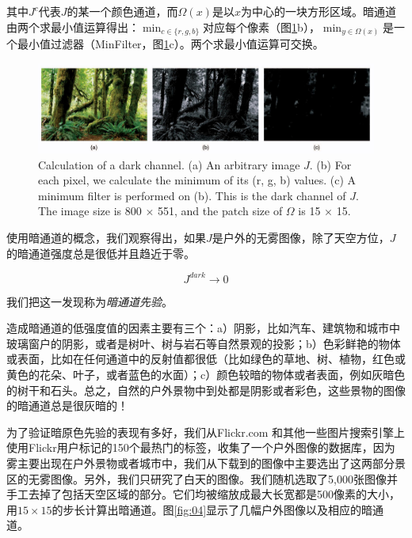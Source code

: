 \documentclass{ctexart}
\begin{document}
其中$J^c$代表$J$的某一个颜色通道，而$\Omega(x)$是以$x$为中心的一块方形区域。暗通道由两个求最小值运算得出：$\min_{c \in \{ r, g, b\}}$对应每个像素（图\ref{fig:03}b），$\min_{y \in \Omega(x)}$是一个最小值过滤器（MinFilter，图\ref{fig:03}c）。两个求最小值运算可交换。\par

\begin{figure}[tbp]
	\centering
	\includegraphics[width=\textwidth]{img/03.jpg}
	\caption{Calculation of a dark channel. (a) An arbitrary image $J$. (b) For each pixel, we calculate the minimum of its (r, g, b) values. (c) A minimum filter is performed on (b). This is the dark channel of $J$. The image size is 800 $\times$ 551, and the patch size of $\Omega$ is 15 $\times$ 15.}\label{fig:03}
\end{figure}

使用暗通道的概念，我们观察得出，如果$J$是户外的无雾图像，除了天空方位，$J$的暗通道强度总是很低并且趋近于零。

\begin{equation}\label{equ:6}
	J^{dark} \to 0
\end{equation}

我们把这一发现称为\emph{暗通道先验}。\par

造成暗通道的低强度值的因素主要有三个：a）阴影，比如汽车、建筑物和城市中玻璃窗户的阴影，或者是树叶、树与岩石等自然景观的投影；b）色彩鲜艳的物体或表面，比如在任何通道中的反射值都很低（比如绿色的草地、树、植物，红色或黄色的花朵、叶子，或者蓝色的水面）；c）颜色较暗的物体或者表面，例如灰暗色的树干和石头。总之，自然的户外景物中到处都是阴影或者彩色，这些景物的图像的暗通道总是很灰暗的！\par

为了验证暗原色先验的表现有多好，我们从Flickr.com 和其他一些图片搜索引擎上使用Flickr用户标记的150个最热门的标签，收集了一个户外图像的数据库，因为雾主要出现在户外景物或者城市中，我们从下载到的图像中主要选出了这两部分景区的无雾图像。另外，我们只研究了白天的图像。我们随机选取了5,000张图像并手工去掉了包括天空区域的部分。它们均被缩放成最大长宽都是500像素的大小，用$15 \times 15$的步长计算出暗通道。图\ref{fig:04}显示了几幅户外图像以及相应的暗通道。\par
\end{document}
